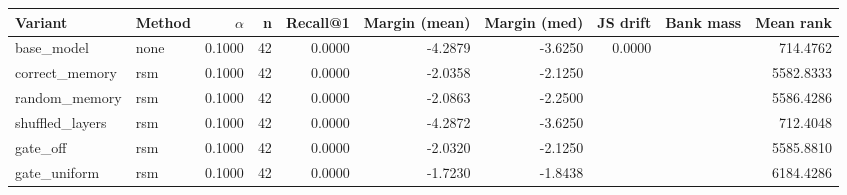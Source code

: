 \begin{tabular}{l l r r r r r r r r}
\toprule
Variant & Method & $\alpha$ & n & Recall@1 & Margin (mean) & Margin (med) & JS drift & Bank mass & Mean rank \\
\midrule
base\_model & none & 0.1000 & 42 & 0.0000 & -4.2879 & -3.6250 & 0.0000 &  & 714.4762 \\
correct\_memory & rsm & 0.1000 & 42 & 0.0000 & -2.0358 & -2.1250 &  &  & 5582.8333 \\
random\_memory & rsm & 0.1000 & 42 & 0.0000 & -2.0863 & -2.2500 &  &  & 5586.4286 \\
shuffled\_layers & rsm & 0.1000 & 42 & 0.0000 & -4.2872 & -3.6250 &  &  & 712.4048 \\
gate\_off & rsm & 0.1000 & 42 & 0.0000 & -2.0320 & -2.1250 &  &  & 5585.8810 \\
gate\_uniform & rsm & 0.1000 & 42 & 0.0000 & -1.7230 & -1.8438 &  &  & 6184.4286 \\
\bottomrule
\end{tabular}
